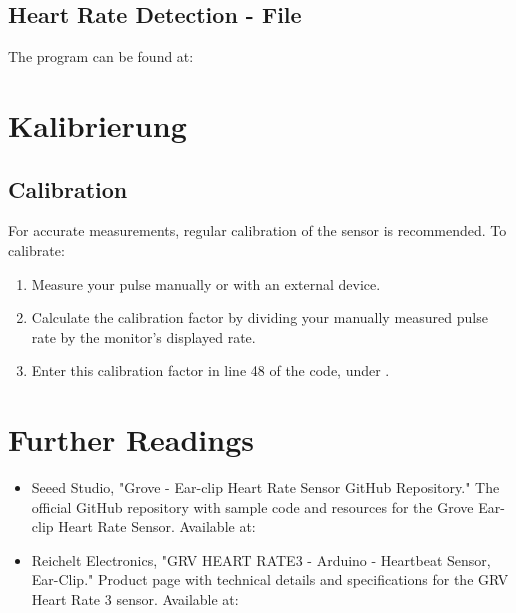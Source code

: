 \subsection{Heart Rate Detection - File}

The program can be found at:

{
}


\section{Kalibrierung}


\subsection{Calibration}

For accurate measurements, regular calibration of the sensor is recommended. To calibrate:

\begin{enumerate}
    \item Measure your pulse manually or with an external device.
    \item Calculate the calibration factor by dividing your manually measured pulse rate by the monitor's displayed rate.
    \item Enter this calibration factor in line 48 of the code, under .
\end{enumerate}




\section{Further Readings}

\begin{itemize}
    
    \item Seeed Studio, "Grove - Ear-clip Heart Rate Sensor GitHub Repository." The official GitHub repository with sample code and resources for the Grove Ear-clip Heart Rate Sensor. Available at: 
    
    \item Reichelt Electronics, "GRV HEART RATE3 - Arduino - Heartbeat Sensor, Ear-Clip." Product page with technical details and specifications for the GRV Heart Rate 3 sensor. Available at: 
    
\end{itemize}

